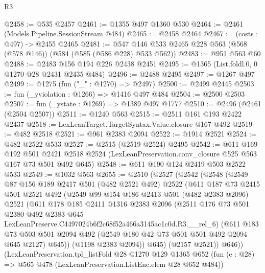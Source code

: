 \begin{lexlean}{R3}
\begin{coremodule}
@2458 := @535 @2457
@2461 := @1355 @497 @1360 @530
@2464 := @2461 (Models.Pipeline.SessionStream @484)
@2465 := @2458 @2464
@2467 := (costs : @497) -> @2455 @2465
@2481 := @547 @146 @533 @2465 @228 @563 (@568 (@578 @146)) (@584 (@585 (@586 @228) @533 @562))
@2483 := @951 @563 @60
@2488 := @2483 @156 @194 @226 @2438 @2451
@2495 := @1365 (List.foldl.{0, 0} @1270 @28 @2431 @2435 @484)
@2496 := @2488 @2495
@2497 := @1267 @497
@2499 := @1275 (fun ("_" : @1270) => @2497)
@2500 := @2499 @2445
@2503 := fun (_yviolation : @1266) => @1416 @497 @484
@2504 := @2500 @2503
@2507 := fun (_ystate : @1269) => @1389 @497 @1777
@2510 := @2496 (@2461 (@2504 @2507))
@2511 := @1240 @563
@2515 := @2511 @161 @193 @2422 @2437
@2518 := LexLeanTarget.TargetSyntax.Value.closure @167 @492
@2519 := @482 @2518
@2521 := @961 @2383 @2094
@2522 := @1914 @2521
@2524 := @482 @2522 @533
@2527 := @2515 (@2519 @2524) @2495
@2542 := @611
    @169
    @192
    @501
    @2421
    @2518
    @2524
    (LexLeanPreservation.conv_closure @525 @563 @167 @73 @501 @492 @645)
@2548 := @611 @190 @124 @2419 @503 @2522 @533
@2549 := @1032 @563
@2655 := @2510
    (@2527
      (@2542
        (@2548
          (@2549
            @87
            @156
            @189
            @2417
            @501
            (@482 @2521 @492)
            @2522
            (@611
              @187
              @73
              @2415
              @501
              @2521
              @492
              (@2549
                @99
                @154
                @186
                @2413
                @501
                (@482 @2383 @2096)
                @2521
                (@611
                  @178
                  @185
                  @2411
                  @1316
                  @2383
                  @2096
                  (@2511
                    @176
                    @73
                    @501
                    @2380
                    @492
                    @2383
                    @645
                    LexLeanPreserve.C4497024b6f2c68f52a466a3145ac1c0d.R3.__rel_6)
                  (@611
                    @183
                    @73
                    @503
                    @501
                    @2094
                    @492
                    (@2549 @180 @42 @73 @501 @501 @492 @2094 @645 @2127)
                    @645))
                (@1198 @2383 @2094))
              @645)
            (@2157 @2521))
          @646))
      (LexLeanPreservation.tpl_listFold
        @28
        @1270
        @129
        @1365
        @652
        (fun (e : @28) => @565 @478 (LexLeanPreservation.ListEnc.elem @28 @652 @484))

\end{coremodule}
\end{lexlean}
